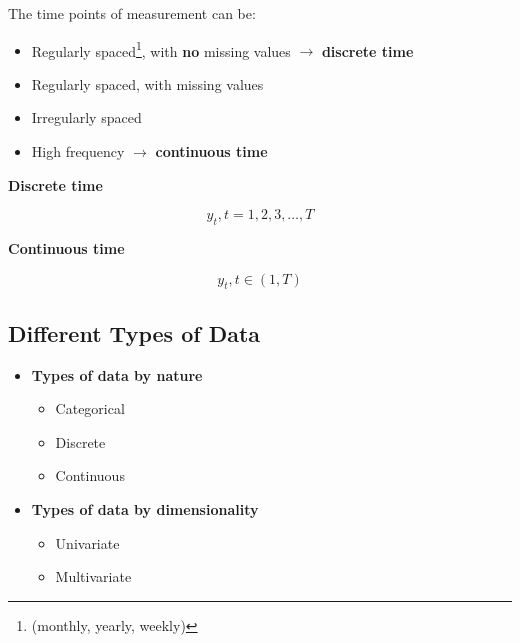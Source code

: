 \documentclass[dvipsnames,12pt]{book}
\begin{document}
                The time points of measurement can be:

                \begin{itemize}
                    \item Regularly spaced\footnote{(monthly, yearly, weekly)}, with \textbf{no} missing values \(\rightarrow\) \textbf{discrete time}
                    \item Regularly spaced, with missing values
                    \item Irregularly spaced
                    \item High frequency \(\rightarrow\) \textbf{continuous time}
                \end{itemize}

            \begin{minipage}{0.48\textwidth}
                \textbf{Discrete time}

                    \begin{equation}
                        y_t,t = 1,2,3, \ldots , T
                    \end{equation}
                    
            \end{minipage}
            \begin{minipage}{0.04\textwidth}
                \hfill\vline\hfill
            \end{minipage}
            \begin{minipage}{0.48\textwidth}
                \textbf{Continuous time}

                    \begin{equation}
                        y_t,t \in (1,T)
                    \end{equation}
            \end{minipage}

            \subsection{Different Types of Data}

                \begin{itemize}
                    \item \textbf{Types of data by nature}
                        \begin{itemize}
                            \item Categorical
                            \item Discrete
                            \item Continuous
                        \end{itemize}
                    \item \textbf{Types of data by dimensionality}
                        \begin{itemize}
                            \item Univariate
                            \item Multivariate
                        \end{itemize}
                \end{itemize}
\end{document}
